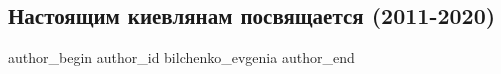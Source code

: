  
 
 
 
 
 
\subsection{Настоящим киевлянам посвящается (2011-2020)}
\label{sec:13_11_2021.fb.bilchenko_evgenia.1.kievljane_gorod}
 
\ifcmt
 author_begin
   author_id bilchenko_evgenia
 author_end
\fi

